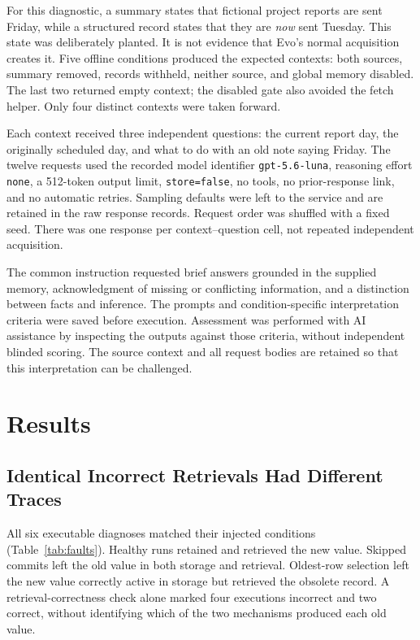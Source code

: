 \documentclass[runningheads]{llncs}
\begin{document}
For this diagnostic, a summary states that fictional project reports are sent Friday, while a structured record states that they are \emph{now} sent Tuesday. This state was deliberately planted. It is not evidence that Evo's normal acquisition creates it. Five offline conditions produced the expected contexts: both sources, summary removed, records withheld, neither source, and global memory disabled. The last two returned empty context; the disabled gate also avoided the fetch helper. Only four distinct contexts were taken forward.

Each context received three independent questions: the current report day, the originally scheduled day, and what to do with an old note saying Friday. The twelve requests used the recorded model identifier \texttt{gpt-5.6-luna}, reasoning effort \texttt{none}, a 512-token output limit, \texttt{store=false}, no tools, no prior-response link, and no automatic retries. Sampling defaults were left to the service and are retained in the raw response records. Request order was shuffled with a fixed seed. There was one response per context--question cell, not repeated independent acquisition.

The common instruction requested brief answers grounded in the supplied memory, acknowledgment of missing or conflicting information, and a distinction between facts and inference. The prompts and condition-specific interpretation criteria were saved before execution. Assessment was performed with AI assistance by inspecting the outputs against those criteria, without independent blinded scoring. The source context and all request bodies are retained so that this interpretation can be challenged.

\section{Results}
\subsection{Identical Incorrect Retrievals Had Different Traces}
All six executable diagnoses matched their injected conditions (Table~\ref{tab:faults}). Healthy runs retained and retrieved the new value. Skipped commits left the old value in both storage and retrieval. Oldest-row selection left the new value correctly active in storage but retrieved the obsolete record. A retrieval-correctness check alone marked four executions incorrect and two correct, without identifying which of the two mechanisms produced each old value.
\end{document}
